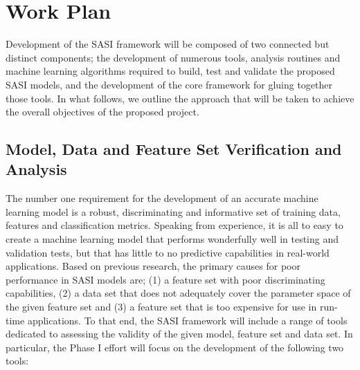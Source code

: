 \section{Work Plan} 
\label{sec:approach}


Development of the SASI framework will be composed of two connected but distinct components; the development of numerous tools, analysis routines and machine learning algorithms required to build, test and validate  the proposed SASI models, and the development of the core framework for gluing together those tools. In what follows, we outline the approach that will be taken to achieve the overall objectives of the proposed project. 

\subsection{ Model, Data and Feature Set Verification and Analysis }
\label{sec:modelvar}
The number one requirement for the development of an accurate machine learning model is a robust, discriminating and informative set of training data, features and classification metrics. Speaking from experience, it is all to easy to create a machine learning model that performs wonderfully well in testing and validation tests, but that has little to no predictive capabilities in real-world applications. Based on previous research, the primary causes for poor performance in SASI models are; (1) a feature set with poor discriminating capabilities, (2) a data set that does not adequately cover the parameter space of the given feature set and (3) a feature set that is too expensive for use in run-time applications. To that end, the SASI framework will include a range of tools dedicated to assessing the validity of the given model, feature set and data set. In particular, the Phase I effort will focus on the development of the following two tools: 

